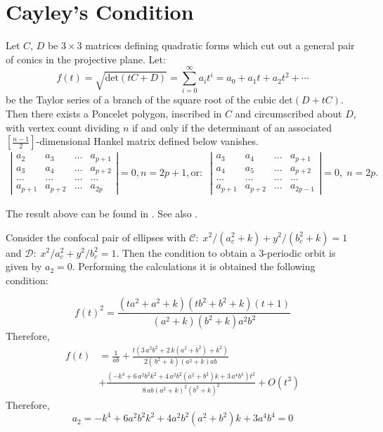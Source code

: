 \section{Cayley's Condition}

Let $C$, $D $ be $3\times 3$ matrices defining quadratic forms which cut out a general pair of conics in the projective plane. Let:
\[f(t)=\sqrt{\mathrm{det}(tC+D)}=\sum_{i=0}^\infty a_it^i=a_0+a_1t+a_2t^2+\cdots
 \]
 be the Taylor series of a branch of the square root of the cubic 
$\mathrm{det}(D+tC)$.
 Then there exists a Poncelet polygon, inscribed in 
$C$ and circumscribed about 
$D$, with vertex count dividing $n$
 if and only if the determinant of an associated 
$[\frac{n-1}{2}]$-dimensional Hankel matrix defined below vanishes. 
 {\small 
 \begin{align*}
     \left|\begin{matrix} a_2 &a_3 &\ldots & a_{p+1}\\
     a_3 & a_4&\ldots & a_{p+2}\\
     \ldots & \ldots & \ldots &\ldots\\
     a_{p+1}& a_{p+2}&\ldots & a_{2p}
     \end{matrix}\right|=0, n=2p+1, \mathrm{or}:\;\;  \left|\begin{matrix} a_3 &a_4 &\ldots & a_{p+1}\\
     a_4 & a_5&\ldots & a_{p+2}\\
     \ldots & \ldots & \ldots &\ldots\\
     a_{p+1}& a_{p+2}&\ldots & a_{2p-1}
     \end{matrix}\right|=0,\; n=2p.
 \end{align*}
 }
 
 The result above can be found in \cite[Chap. 4]{drag_milena2011}. See also \cite{oliver-2021}.
 
 Consider the confocal pair of ellipses   with $\mathcal{C}: \; x^2/(a_c^2+k)+y^2/(b_c^2+k)=1$ and $\mathcal{D}:\;  x^2/a_c^2+y^2/b_c^2=1$.
  Then the condition to obtain a 3-periodic orbit is given by $a_2=0$. Performing the calculations it is obtained the following condition:  
  
 \[f(t)^2= {\frac { \left( t{a}^{2}+{a}^{2}+k \right)  \left( t{b}^{2}+{b}^{2}+k
 \right)  \left( t+1 \right) }{ \left( {a}^{2}+k \right)  \left( {b}^{
2}+k \right) {a}^{2}{b}^{2}}}\]
Therefore,
{\small  
\begin{align*}
f(t)&= {\frac {1}{ab}}+{\frac {t \left( 3\,{a}^{2}{b}^{2}+2\,k \left( {a}^{2}
+{b}^{2} \right) +{k}^{2} \right) }{ 2\left( \,{b}^{2}+\,k \right) 
 \left( {a}^{2}+k \right) ab}}\\
 &+{\frac { \left( -{k}^{4}+6\,{a}^{2}{b}^
{2}{k}^{2}+4\,{a}^{2}{b}^{2} \left( {a}^{2}+{b}^{2} \right) k+3\,{a}^{
4}{b}^{4} \right) {t}^{2}}{8\,ab \left( {a}^{2}+k \right) ^{2} \left( 
{b}^{2}+k \right) ^{2}}}
 +O(t^3)    
\end{align*}
}
Therefore,
 \[a_2=-k^4 + 6a^2b^2k^2 + 4a^2b^2(a^2 + b^2)k + 3a^4b^4=0\]
 
